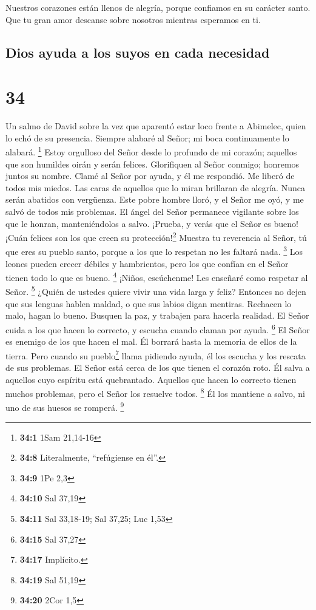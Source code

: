  Nuestros corazones están llenos de alegría, porque
confiamos en su carácter santo.  Que tu gran amor
descanse sobre nosotros mientras esperamos en ti.

\hypertarget{dios-ayuda-a-los-suyos-en-cada-necesidad}{%
\subsection{Dios ayuda a los suyos en cada
necesidad}\label{dios-ayuda-a-los-suyos-en-cada-necesidad}}

\hypertarget{section-33}{%
\section{34}\label{section-33}}

Un salmo de David sobre la vez que aparentó estar loco frente a
Abimelec, quien lo echó de su presencia.  Siempre alabaré
al Señor; mi boca continuamente lo alabará. \footnote{\textbf{34:1} 1Sam
  21,14-16}  Estoy orgulloso del Señor desde lo profundo
de mi corazón; aquellos que son humildes oirán y serán felices.
 Glorifiquen al Señor conmigo; honremos juntos su nombre.
 Clamé al Señor por ayuda, y él me respondió. Me liberó de
todos mis miedos.  Las caras de aquellos que lo miran
brillaran de alegría. Nunca serán abatidos con vergüenza. 
Este pobre hombre lloró, y el Señor me oyó, y me salvó de todos mis
problemas.  El ángel del Señor permanece vigilante sobre
los que le honran, manteniéndolos a salvo.  ¡Prueba, y
verás que el Señor es bueno! ¡Cuán felices son los que creen su
protección!\footnote{\textbf{34:8} Literalmente, ``refúgiense en él''.}
 Muestra tu reverencia al Señor, tú que eres su pueblo
santo, porque a los que lo respetan no les faltará nada. \footnote{\textbf{34:9}
  1Pe 2,3}  Los leones pueden crecer débiles y
hambrientos, pero los que confían en el Señor tienen todo lo que es
bueno. \footnote{\textbf{34:10} Sal 37,19}  ¡Niños,
escúchenme! Les enseñaré como respetar al Señor. \footnote{\textbf{34:11}
  Sal 33,18-19; Sal 37,25; Luc 1,53}  ¿Quién de ustedes
quiere vivir una vida larga y feliz?  Entonces no dejen
que sus lenguas hablen maldad, o que sus labios digan mentiras.
 Rechacen lo malo, hagan lo bueno. Busquen la paz, y
trabajen para hacerla realidad.  El Señor cuida a los que
hacen lo correcto, y escucha cuando claman por ayuda. \footnote{\textbf{34:15}
  Sal 37,27}  El Señor es enemigo de los que hacen el
mal. Él borrará hasta la memoria de ellos de la tierra. 
Pero cuando su pueblo\footnote{\textbf{34:17} Implícito.} llama pidiendo
ayuda, él los escucha y los rescata de sus problemas.  El
Señor está cerca de los que tienen el corazón roto. Él salva a aquellos
cuyo espíritu está quebrantado.  Aquellos que hacen lo
correcto tienen muchos problemas, pero el Señor los resuelve todos.
\footnote{\textbf{34:19} Sal 51,19}  Él los mantiene a
salvo, ni uno de sus huesos se romperá. \footnote{\textbf{34:20} 2Cor
  1,5}


